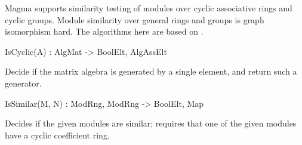 
Magma supports similarity testing of modules over cyclic associative rings and cyclic groups.
Module similarity over general rings and groups is graph isomorphism hard.  The algorithms
here are based on \cite{BW:Module-iso}.

\begin{intrinsics}
IsCyclic(A) : AlgMat -> BoolElt, AlgAssElt
\end{intrinsics}

Decide if the matrix algebra is generated by a single element, and return such a generator.

\begin{intrinsics}
IsSimilar(M, N) : ModRng, ModRng -> BoolElt, Map
\end{intrinsics}

Decides if the given modules are similar; requires that one of the given modules have a cyclic coefficient ring.

